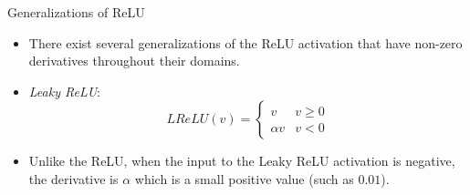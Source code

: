 \begin{frame} {Generalizations of ReLU}
  \begin{itemize}
    \item There exist several generalizations of the ReLU activation that have non-zero derivatives throughout their domains.
    \item \emph{Leaky ReLU}: 
    $$  LReLU(v) = \begin{cases} 
          v & v \geq 0 \\
          \alpha v & v < 0 
       \end{cases} $$
    \begin{figure}
      \centering
    \end{figure}
    \item Unlike the ReLU, when the input to the Leaky ReLU activation is negative, the derivative is $\alpha$ which is a small positive value (such as $0.01$).
  \end{itemize}
\end{frame}


